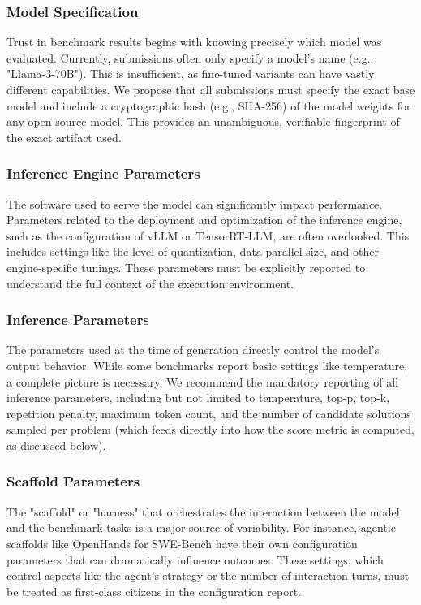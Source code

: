 \documentclass{IEEEcsmag}
\begin{document}
\subsubsection{Model Specification}
Trust in benchmark results begins with knowing precisely which model was evaluated. Currently, submissions often only specify a model's name (e.g., "Llama-3-70B"). This is insufficient, as fine-tuned variants can have vastly different capabilities. We propose that all submissions must specify the exact base model and include a cryptographic hash (e.g., SHA-256) of the model weights for any open-source model. This provides an unambiguous, verifiable fingerprint of the exact artifact used.


\subsubsection{Inference Engine Parameters}
The software used to serve the model can significantly impact performance. Parameters related to the deployment and optimization of the inference engine, such as the configuration of vLLM or TensorRT-LLM, are often overlooked. This includes settings like the level of quantization, data-parallel size, and other engine-specific tunings. These parameters must be explicitly reported to understand the full context of the execution environment.


\subsubsection{Inference Parameters}
The parameters used at the time of generation directly control the model's output behavior. While some benchmarks report basic settings like temperature, a complete picture is necessary. We recommend the mandatory reporting of all inference parameters, including but not limited to temperature, top-p, top-k, repetition penalty, maximum token count, and the number of candidate solutions sampled per problem (which feeds directly into how the score metric is computed, as discussed below).


\subsubsection{Scaffold Parameters}
The "scaffold" or "harness" that orchestrates the interaction between the model and the benchmark tasks is a major source of variability. For instance, agentic scaffolds like OpenHands for SWE-Bench have their own configuration parameters that can dramatically influence outcomes. These settings, which control aspects like the agent's strategy or the number of interaction turns, must be treated as first-class citizens in the configuration report.
\end{document}
